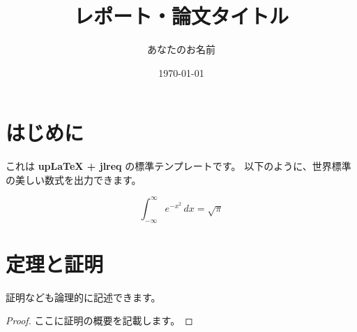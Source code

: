 \documentclass[uplatex,dvipdfmx]{jlreq} %
\title{レポート・論文タイトル}
\author{あなたのお名前}
\date{\today}
\begin{document}
\maketitle

\section{はじめに}
これは \textbf{upLaTeX + jlreq} の標準テンプレートです。
以下のように、世界標準の美しい数式を出力できます。

\begin{equation}
   \int_{-\infty}^{\infty} e^{-x^2}\, dx = \sqrt{\pi}
\end{equation}

\section{定理と証明}
証明なども論理的に記述できます。

\begin{proof}
ここに証明の概要を記載します。
\end{proof}
\end{document}
